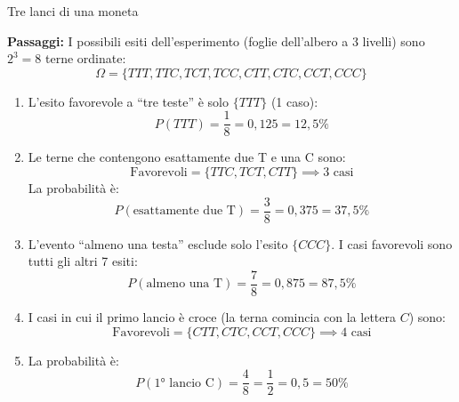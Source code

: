 \begin{esercizio}{Tre lanci di una moneta}
\begin{soluzione}
  \textbf{Passaggi:}
  I possibili esiti dell'esperimento (foglie dell'albero a 3 livelli) sono $2^3 = 8$ terne ordinate:
  \[
  \Omega = \{TTT, TTC, TCT, TCC, CTT, CTC, CCT, CCC\}
  \]
  \begin{enumerate}[label=\alph*)]
    \item L'esito favorevole a ``tre teste'' è solo $\{TTT\}$ (1 caso):
    \[
    P(TTT) = \frac{1}{8} = 0{,}125 = 12{,}5\%
    \]
    \item Le terne che contengono esattamente due T e una C sono:
    \[
    \text{Favorevoli} = \{TTC, TCT, CTT\} \implies 3 \text{ casi}
    \]
    La probabilità è:
    \[
    P(\text{esattamente due T}) = \frac{3}{8} = 0{,}375 = 37{,}5\%
    \]
    \item L'evento ``almeno una testa'' esclude solo l'esito $\{CCC\}$. I casi favorevoli sono tutti gli altri 7 esiti:
    \[
    P(\text{almeno una T}) = \frac{7}{8} = 0{,}875 = 87{,}5\%
    \]
    \item I casi in cui il primo lancio è croce (la terna comincia con la lettera $C$) sono:
    \[
    \text{Favorevoli} = \{CTT, CTC, CCT, CCC\} \implies 4 \text{ casi}
    \]
    \item La probabilità è:
    \[
    P(\text{1° lancio C}) = \frac{4}{8} = \frac{1}{2} = 0{,}5 = 50\%
    \]
  \end{enumerate}
\end{soluzione}
\end{esercizio}
